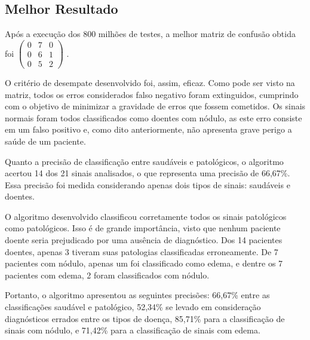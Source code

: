 \documentclass[a4paper,12pt,oneside]{report}
\begin{document}
\subsection{Melhor Resultado}
\hspace*{15pt} Ap\'{o}s a execu\c{c}\~{a}o dos 800 milh\~{o}es de testes, a melhor matriz de confus\~{a}o obtida foi 
$
\left(\begin{smallmatrix}
0 & 7 & 0 \\
0 & 6 & 1 \\
0 & 5 & 2 
\end{smallmatrix}\right)
$ .
\\
\par O crit\'{e}rio de desempate desenvolvido foi, assim, eficaz. Como pode ser visto na matriz, todos os erros considerados falso negativo foram extinguidos, cumprindo com o objetivo de minimizar a gravidade de erros que fossem cometidos.  Os sinais normais foram todos classificados como doentes com n\'{o}dulo, as este erro consiste em um falso positivo e, como dito anteriormente, n\~{a}o apresenta grave perigo a sa\'{u}de de um paciente. 
\\
\par Quanto a precis\~{a}o de classifica\c{c}\~{a}o entre saud\'{a}veis e patol\'{o}gicos, o algoritmo acertou 14 dos 21 sinais analisados, o que representa uma precis\~{a}o de 66,67\%. Essa precis\~{a}o foi medida considerando apenas dois tipos de sinais: saud\'{a}veis e doentes. 
\\
\par O 	algoritmo desenvolvido classificou corretamente todos os sinais patol\'{o}gicos como patol\'{o}gicos. Isso \'{e} de grande import\^{a}ncia, visto que nenhum paciente doente seria prejudicado por uma aus\^{e}ncia de diagn\'{o}stico. Dos 14 pacientes doentes, apenas 3 tiveram suas patologias classificadas erroneamente. De 7 pacientes com n\'{o}dulo, apenas um foi classificado como edema, e dentre os 7 pacientes com edema, 2 foram classificados com n\'{o}dulo. 
\\
\par Portanto, o algoritmo apresentou as seguintes precis\~{o}es: 66,67\% entre as clas\-si\-fi\-ca\-\c{c}\~{o}es saud\'{a}vel e patol\'{o}gico, 52,34\% se levado em considera\c{c}\~{a}o diagn\'{o}sticos errados entre os tipos de doen\c{c}a, 85,71\% para a classifica\c{c}\~{a}o de sinais com n\'{o}dulo, e 71,42\% para a classifica\c{c}\~{a}o de sinais com edema.
\end{document}
